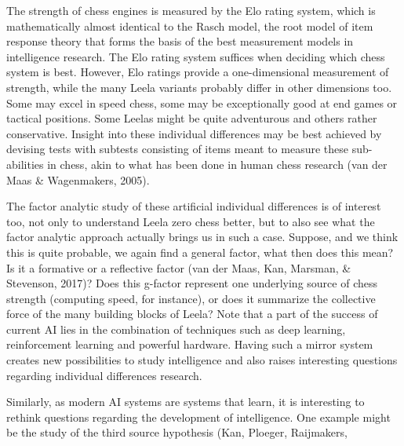 The strength of chess engines is measured by the Elo rating system,
which is mathematically almost identical to the Rasch model, the
root model of item response theory that forms the basis of the best
measurement models in intelligence research.
The Elo rating system suffices when deciding which chess system
is best.
However, Elo ratings provide a one-dimensional measurement of
strength, while the many Leela variants probably differ in other
dimensions too.
Some may excel in speed chess, some may be exceptionally good
at end games or tactical positions.
Some Leelas might be quite adventurous and others rather conservative.
Insight into these individual differences may be best achieved
by devising tests with subtests consisting of items meant to measure
these sub-abilities in chess, akin to what has been done in human
chess research (van der Maas \& Wagenmakers, 2005).

The factor analytic study of these artificial individual differences
is of interest too, not only to understand Leela zero chess better,
but to also see what the factor analytic approach actually brings
us in such a case.
Suppose, and we think this is quite probable, we again find a general
factor, what then does this mean?
Is it a formative or a reflective factor
(van der Maas, Kan, Marsman, \& Stevenson, 2017)?
Does this g-factor represent one underlying source of chess strength
(computing speed, for instance), or does it summarize the collective
force of the many building blocks of Leela?
Note that a part of the success of current AI lies in the combination
of techniques such as deep learning, reinforcement learning and
powerful hardware.
Having such a mirror system creates new possibilities to study
intelligence and also raises interesting questions regarding
individual differences research.

Similarly, as modern AI systems are systems that learn, it is
interesting to rethink questions regarding the development
of intelligence.
One example might be the study of the third source hypothesis
(Kan, Ploeger, Raijmakers,
